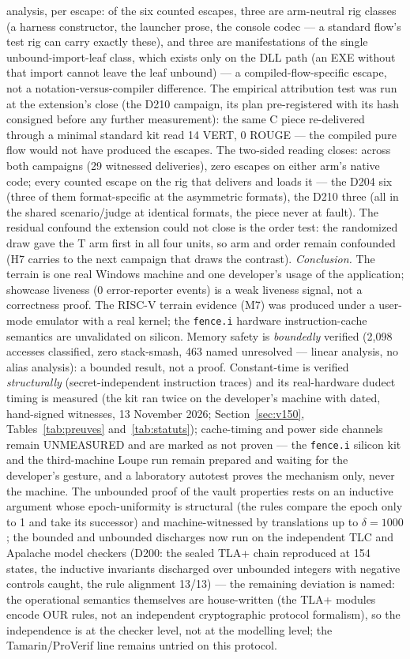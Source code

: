 \documentclass[11pt,a4paper]{article}
\newcommand{\code}[1]{\texttt{\small #1}}
\begin{document}
analysis, per escape: of the six counted escapes, three are
arm-neutral rig classes (a harness constructor, the launcher prose,
the console codec --- a standard flow's test rig can carry exactly
these), and three are manifestations of the single unbound-import-leaf
class, which exists only on the DLL path (an EXE without that import
cannot leave the leaf unbound) --- a compiled-flow-specific escape,
not a notation-versus-compiler difference. The empirical
attribution test was run at the extension's close (the D210 campaign,
its plan pre-registered with its hash consigned before any further
measurement): the same C piece re-delivered through a minimal
standard kit read 14 VERT, 0 ROUGE --- the compiled pure flow would
not have produced the escapes. The two-sided reading closes: across
both campaigns (29 witnessed deliveries), zero escapes on either
arm's native code; every counted escape on the rig that delivers and
loads it --- the D204 six (three of them format-specific at the
asymmetric formats), the D210 three (all in the shared scenario/judge
at identical formats, the piece never at fault). The residual
confound the extension could not close is the order test: the
randomized draw gave the T arm first in all four units, so arm and
order remain confounded (H7 carries to the next campaign that draws
the contrast).
\emph{Conclusion.} The terrain is one real Windows machine and one
developer's usage of the application; showcase liveness (0 error-reporter
events) is a weak liveness signal, not a correctness proof. The RISC-V terrain
evidence (M7) was produced under a user-mode emulator with a real
kernel; the \code{fence.i} hardware instruction-cache semantics are
unvalidated on silicon. Memory safety
is \emph{boundedly} verified (2{,}098 accesses classified, zero
stack-smash, 463 named unresolved --- linear analysis, no alias
analysis): a bounded result, not a proof. Constant-time is verified
\emph{structurally} (secret-independent instruction traces) and its
real-hardware dudect timing is measured (the kit ran twice on the
developer's machine with dated, hand-signed witnesses, 13 November 2026;
Section~\ref{sec:v150}, Tables~\ref{tab:preuves} and~\ref{tab:statuts});
cache-timing and power side channels remain
UNMEASURED and are marked as not proven --- the \code{fence.i} silicon kit
and the third-machine Loupe run remain prepared and waiting for the
developer's gesture, and a laboratory autotest
proves the mechanism only, never the machine. The unbounded proof of
the vault properties rests on an inductive argument whose
epoch-uniformity is structural (the rules compare the epoch only to
1 and take its successor) and machine-witnessed by translations up
to $\delta = 1000$; the bounded and unbounded discharges now run on
the independent TLC and Apalache model checkers (D200: the sealed
TLA+ chain reproduced at 154 states, the inductive invariants
discharged over unbounded integers with negative controls caught,
the rule alignment 13/13) --- the remaining deviation is named: the
operational semantics themselves are house-written (the TLA+
modules encode OUR rules, not an independent cryptographic
protocol formalism), so the independence is at the checker level,
not at the modelling level; the Tamarin/ProVerif line remains
untried on this protocol.
\end{document}
